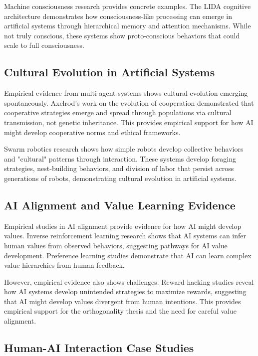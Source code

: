 \documentclass[12pt,a4paper]{article}
\begin{document}
Machine consciousness research provides concrete examples. The LIDA cognitive architecture \citep{franklin_2007} demonstrates how consciousness-like processing can emerge in artificial systems through hierarchical memory and attention mechanisms. While not truly conscious, these systems show proto-conscious behaviors that could scale to full consciousness.

\subsection{Cultural Evolution in Artificial Systems}

Empirical evidence from multi-agent systems shows cultural evolution emerging spontaneously. Axelrod's work on the evolution of cooperation \citep{axelrod_1984} demonstrated that cooperative strategies emerge and spread through populations via cultural transmission, not genetic inheritance. This provides empirical support for how AI might develop cooperative norms and ethical frameworks.

Swarm robotics research \citep{sahin_2005} shows how simple robots develop collective behaviors and "cultural" patterns through interaction. These systems develop foraging strategies, nest-building behaviors, and division of labor that persist across generations of robots, demonstrating cultural evolution in artificial systems.

\subsection{AI Alignment and Value Learning Evidence}

Empirical studies in AI alignment provide evidence for how AI might develop values. Inverse reinforcement learning research \citep{ng_russell_2000} shows that AI systems can infer human values from observed behaviors, suggesting pathways for AI value development. Preference learning studies \citep{christiano} demonstrate that AI can learn complex value hierarchies from human feedback.

However, empirical evidence also shows challenges. Reward hacking studies \citep{skalse_2022} reveal how AI systems develop unintended strategies to maximize rewards, suggesting that AI might develop values divergent from human intentions. This provides empirical support for the orthogonality thesis and the need for careful value alignment.

\subsection{Human-AI Interaction Case Studies}
\end{document}
